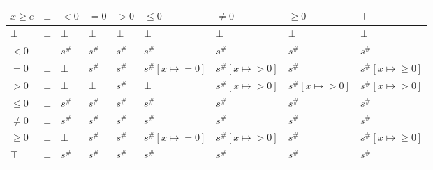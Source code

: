 \documentclass{article}
\begin{document}
                    \begin{table}
                        \begin{tabular}{|l|l|l|l|l|l|l|l|l|}
                        \hline
                        $x \ge e$ & $\bot$ & $<0$   & $=0$   & $>0$   & $\le 0$              & $\ne 0$              & $\ge 0$              & $\top$                  \\ \hline
                        $\bot$        & $\bot$ & $\bot$ & $\bot$ & $\bot$ & $\bot$               & $\bot$               & $\bot$               & $\bot$                  \\ \hline
                        $<0$          & $\bot$ & $s^\#$ & $s^\#$ & $s^\#$ & $s^\#$               & $s^\#$               & $s^\#$               & $s^\#$                  \\ \hline
                        $=0$          & $\bot$ & $\bot$ & $s^\#$ & $s^\#$ & $s^\#[x \mapsto =0]$ & $s^\#[x \mapsto >0]$ & $s^\#$               & $s^\#[x \mapsto \ge 0]$ \\ \hline
                        $>0$          & $\bot$ & $\bot$ & $\bot$ & $s^\#$ & $\bot$               & $s^\#[x \mapsto >0]$ & $s^\#[x \mapsto >0]$ & $s^\#[x \mapsto >0]$    \\ \hline
                        $\le 0$       & $\bot$ & $s^\#$ & $s^\#$ & $s^\#$ & $s^\#$               & $s^\#$               & $s^\#$               & $s^\#$                  \\ \hline
                        $\ne 0$       & $\bot$ & $s^\#$ & $s^\#$ & $s^\#$ & $s^\#$               & $s^\#$               & $s^\#$               & $s^\#$                  \\ \hline
                        $\ge 0$       & $\bot$ & $\bot$ & $s^\#$ & $s^\#$ & $s^\#[x \mapsto =0]$ & $s^\#[x \mapsto >0]$ & $s^\#$               & $s^\#[x \mapsto \ge 0]$ \\ \hline
                        $\top$        & $\bot$ & $s^\#$ & $s^\#$ & $s^\#$ & $s^\#$               & $s^\#$               & $s^\#$               & $s^\#$                  \\ \hline
                        \end{tabular}
                        \end{table}
\end{document}
